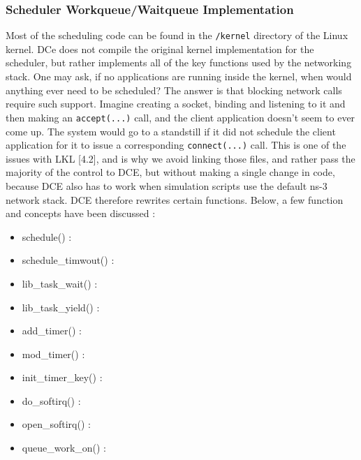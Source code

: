 \documentclass{sig-alternate}
\begin{document}
\subsubsection{Scheduler Workqueue/Waitqueue Implementation}
Most of the scheduling code can be found in the \texttt{/kernel} directory of the Linux kernel. DCe does not compile the 
original kernel implementation for the scheduler, but rather implements all of the key functions used by the networking stack.  One may ask,
if no applications are running inside the kernel, when would anything ever need to be scheduled?  The answer is that 
blocking network calls require such support.  Imagine creating a socket, binding and listening to it and then making an \texttt{accept(...)} call, and the client 
application doesn’t seem to ever come up. The system would go to a standstill if it did not schedule the client application for it to issue a 
corresponding \texttt{connect(...)} call. This is one of the issues with LKL [4.2], and is why we avoid linking those files, and rather pass the 
majority of the control to DCE, but without making a single change in code, because DCE also has to work when simulation scripts use the 
default ns-3 network stack.  DCE therefore rewrites certain functions. Below, a few function and concepts have been discussed : 

\begin{itemize}
\item schedule() : 
\item schedule\_timwout() :
\item lib\_task\_wait() :
\item lib\_task\_yield() : 
\item add\_timer() : 
\item mod\_timer() :
\item init\_timer\_key() :
\item do\_softirq() :
\item open\_softirq() :
\item queue\_work\_on() :
\end{itemize}
\end{document}
